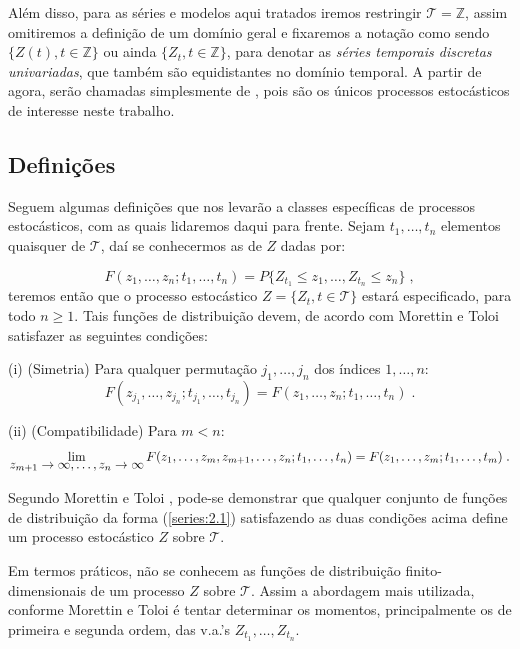 Além disso, para as séries e modelos aqui tratados iremos restringir $\mathcal{T} = \mathbb{Z}$, assim omitiremos a definição de um domínio geral e fixaremos a notação como sendo $\{Z(t), t \in \mathbb{Z}\}$ ou ainda $\{Z_t, t \in \mathbb{Z}\}$, para denotar as \emph{séries temporais discretas univariadas}, que também são equidistantes no domínio temporal. A partir de agora, serão chamadas simplesmente de , pois são os únicos processos estocásticos de interesse neste trabalho.

\subsection{Definições}

Seguem algumas definições que nos levarão a classes específicas de processos estocásticos, com as quais lidaremos daqui para frente. Sejam $t_1, \ldots, t_n$ elementos quaisquer de $\mathcal{T}$, daí se conhecermos as  de $Z$ dadas por:

\begin{equation}\label{series:2.1}
F(z_1, \ldots, z_n; t_1, \ldots, t_n) = P\{ Z_{t_1} \leq z_1, \ldots, Z_{t_n} \leq z_n \}\;,
\end{equation}
teremos então que o processo estocástico $Z = \{ Z_t, t \in \mathcal{T} \}$ estará especificado, para todo $n \geq 1$. Tais funções de distribuição devem, de acordo com Morettin e Toloi \citep{morettin} satisfazer as seguintes condições:

	(i) (Simetria) Para qualquer permutação $j_1, \ldots, j_n$ dos índices $1, \dots, n$:
\[ F(z_{j_1}, \ldots, z_{j_n}; t_{j_1}, \ldots, t_{j_n}) = F(z_1, \ldots, z_n; t_1, \ldots, t_n)\;. \]

	(ii) (Compatibilidade) Para $m < n$:
\[ \lim_{\mathlarger{z_{m+1} \to \infty, \ldots, z_n \to \infty}} F(z_1, \ldots, z_m, z_{m+1}, \ldots, z_n; t_1, \ldots, t_n) = F(z_1, \ldots, z_m; t_1, \ldots, t_m)\;. \]

Segundo Morettin e Toloi \citep{morettin}, pode-se demonstrar que qualquer conjunto de funções de distribuição da forma (\ref{series:2.1}) satisfazendo as duas condições acima define um processo estocástico $Z$ sobre $\mathcal{T}$.

Em termos práticos, não se conhecem as funções de distribuição finito-dimensionais de um processo $Z$ sobre $\mathcal{T}$. Assim a abordagem mais utilizada, conforme Morettin e Toloi \citep{morettin} é tentar determinar os momentos, principalmente os de primeira e segunda ordem, das v.a.'s $Z_{t_1}, \ldots, Z_{t_n}$. 

